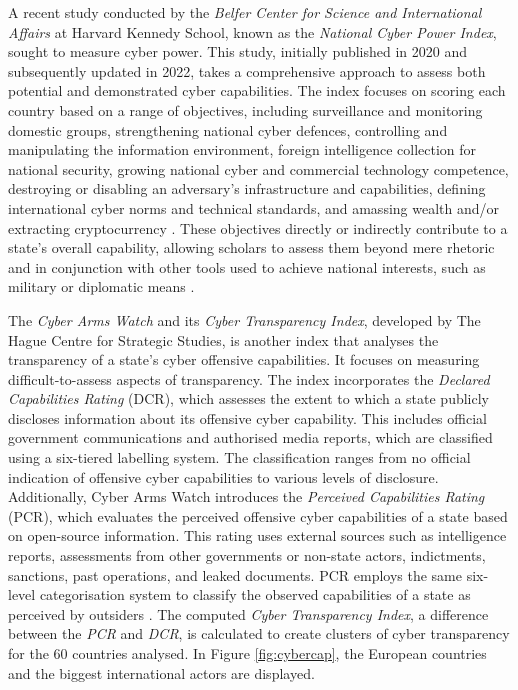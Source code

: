 A recent study conducted by the \textit{Belfer Center for Science and International Affairs} at Harvard Kennedy School, known as the \textit{National Cyber Power Index}, sought to measure cyber power. This study, initially published in 2020 and subsequently updated in 2022, takes a comprehensive approach to assess both potential and demonstrated cyber capabilities. The index focuses on scoring each country based on a range of objectives, including surveillance and monitoring domestic groups, strengthening national cyber defences, controlling and manipulating the information environment, foreign intelligence collection for national security, growing national cyber and commercial technology competence, destroying or disabling an adversary's infrastructure and capabilities, defining international cyber norms and technical standards, and amassing wealth and/or extracting cryptocurrency \autocite[5-6]{voo_2022_national}. These objectives directly or indirectly contribute to a state's overall capability, allowing scholars to assess them beyond mere rhetoric and in conjunction with other tools used to achieve national interests, such as military or diplomatic means \autocite{voo_2022_national}.  


The \textit{Cyber Arms Watch} and its \textit{Cyber Transparency Index}, developed by The Hague Centre for Strategic Studies, is another index that analyses the transparency of a state's cyber offensive capabilities. It focuses on measuring difficult-to-assess aspects of transparency. The index incorporates the \textit{Declared Capabilities Rating} (DCR), which assesses the extent to which a state publicly discloses information about its offensive cyber capability. This includes official government communications and authorised media reports, which are classified using a six-tiered labelling system. The classification ranges from no official indication of offensive cyber capabilities to various levels of disclosure. Additionally, Cyber Arms Watch introduces the \textit{Perceived Capabilities Rating} (PCR), which evaluates the perceived offensive cyber capabilities of a state based on open-source information. This rating uses external sources such as intelligence reports, assessments from other governments or non-state actors, indictments, sanctions, past operations, and leaked documents. PCR employs the same six-level categorisation system to classify the observed capabilities of a state as perceived by outsiders \autocite[4]{faesen_2022_cyber}. The computed \textit{Cyber Transparency Index}, a difference between the \textit{PCR} and \textit{DCR}, is calculated to create clusters of cyber transparency for the 60 countries analysed. In Figure \ref{fig:cybercap}, the European countries and the biggest international actors are displayed. 

